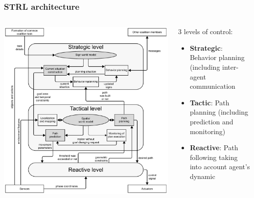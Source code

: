 \documentclass[default]{beamer}
\begin{document}
	\begin{frame}
		\frametitle{STRL architecture}
		
		\begin{columns}
			\begin{column}{0.6\textwidth}
				\centering
				\includegraphics[width=\textwidth]{strl/strl_rita_eng}
			\end{column}
			\begin{column}{0.4\textwidth}
				3 levels of control:
				\begin{itemize}
					\item \textbf{Strategic}: Behavior planning (including inter-agent communication
					\item \textbf{Tactic}: Path planning (including prediction and monitoring)
					\item \textbf{Reactive}: Path following taking into account agent’s dynamic
				\end{itemize}
			\end{column}
		\end{columns}
	\end{frame}
\end{document}

